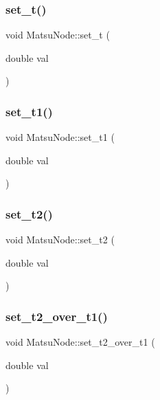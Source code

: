 \mbox{\label{classMatsuNode_af68c93af36bc872c0b99c2060648fde5}} 
\subsubsection{\texorpdfstring{set\+\_\+t()}{set\_t()}}
{\footnotesize\ttfamily void Matsu\+Node\+::set\+\_\+t (\begin{DoxyParamCaption}\item[{double}]{val }\end{DoxyParamCaption})}

\mbox{\label{classMatsuNode_ae082ffc97e6744b6fce1d6bc94efbca2}} 
\subsubsection{\texorpdfstring{set\+\_\+t1()}{set\_t1()}}
{\footnotesize\ttfamily void Matsu\+Node\+::set\+\_\+t1 (\begin{DoxyParamCaption}\item[{double}]{val }\end{DoxyParamCaption})}

\mbox{\label{classMatsuNode_ab2b901994e0811066e3c452414fcbad7}} 
\subsubsection{\texorpdfstring{set\+\_\+t2()}{set\_t2()}}
{\footnotesize\ttfamily void Matsu\+Node\+::set\+\_\+t2 (\begin{DoxyParamCaption}\item[{double}]{val }\end{DoxyParamCaption})}

\mbox{\label{classMatsuNode_abc14c3e623fd341dc012a6640bbf1ebd}} 
\subsubsection{\texorpdfstring{set\+\_\+t2\+\_\+over\+\_\+t1()}{set\_t2\_over\_t1()}}
{\footnotesize\ttfamily void Matsu\+Node\+::set\+\_\+t2\+\_\+over\+\_\+t1 (\begin{DoxyParamCaption}\item[{double}]{val }\end{DoxyParamCaption})}

